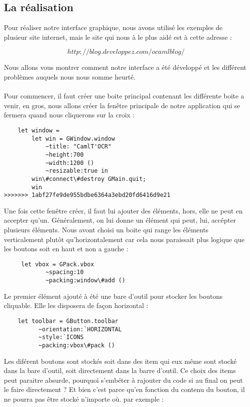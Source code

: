 	\subsection{La réalisation}
	Pour réaliser notre interface graphique, nous avons utilisé les exemples de plusieur site internet, mais le site qui nous à le plus aidé est à cette adresse :
	\begin{center}
	\[http://blog.developpez.com/ocamlblog/\]
	\end{center}
	Nous allons vous montrer comment notre interface a été développé et les différent problèmes auquels nous nous somme heurté.\\
	\\
	Pour commencer, il faut créer une boite principal contenant les différente boite a venir, en gros, nous allons créer la fenêtre principale de notre application qui se fermera quand nous cliquerons sur la croix :
	
	\begin{lstlisting}
	let window =
		let win = GWindow.window
			~title: "CamlT'OCR"
			~height:700
			~width:1200 ()
			~resizable:true in
		win\#connect\#destroy GMain.quit;
		win 
>>>>>>> 1abf27fe9de955bdbe6364a3ebd20fd6416d9e21
	\end{lstlisting}

	Une fois cette fenêtre créer, il faut lui ajouter des éléments, hors, elle ne peut en accepter qu'un. Généralement, on lui donne un élément qui peut, lui, accépter plusieurs éléments. Nous avont choisi un boite qui range les éléments verticalement plutôt qu'horizontalement car cela nous paraissait plus logique que les boutons soit en haut et non a gauche :\\
	
	\begin{lstlisting}
	 let vbox = GPack.vbox
			~spacing:10
			~packing:window\#add () 
	\end{lstlisting}

	Le premier élément ajouté à été une bare d'outil pour stocker les boutons cliquable. Elle les disposera de façon horizontal : 

	\begin{lstlisting}
	let toolbar = GButton.toolbar
		  ~orientation:`HORIZONTAL
		  ~style:`ICONS
		  ~packing:vbox\#pack ()
	\end{lstlisting}

	Les diférent boutons sont stockés soit dans des item qui eux même sont stocké dans la bare d'outil, soit directement dans la barre d'outil. Ce choix des items peut paraitre absurde, pourquoi s'embéter à rajouter du code si au final on peut le faire directement ? Et bien c'est parce qu'en fonction du contenu du bouton, il ne pourra pas être stocké n'importe où. par exemple :\\ 

